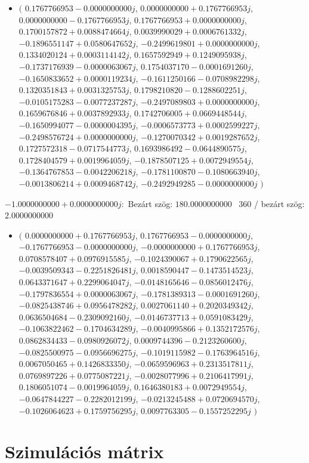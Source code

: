 \documentclass[14pt,a4paper]{article}
\begin{document}
\begin{itemize}
\item
$\big($
$0.1767766953-0.0000000000j$, $0.0000000000+0.1767766953j$, $0.0000000000-0.1767766953j$, $0.1767766953+0.0000000000j$, $0.1700157872+0.0088474664j$, $0.0039990029+0.0006761332j$, $-0.1896551147+0.0580647652j$, $-0.2499619801+0.0000000000j$, $0.1334020124+0.0003114142j$, $0.1657592949+0.1249095938j$, $-0.1737176939-0.0000063067j$, $0.1754037170-0.0001691260j$, $-0.1650833652+0.0000119234j$, $-0.1611250166-0.0708982298j$, $0.1320351843+0.0031325753j$, $0.1798210820-0.1288602251j$, $-0.0105175283-0.0077237287j$, $-0.2497089803+0.0000000000j$, $0.1659676846+0.0037892933j$, $0.1742706005+0.0669448544j$, $-0.1650994077-0.0000004395j$, $-0.0006573773+0.0002599227j$, $-0.2498576724+0.0000000000j$, $-0.1270070342+0.0019287652j$, $0.1727572318-0.0717544773j$, $0.1693986492-0.0644890575j$, $0.1728404579+0.0019964059j$, $-0.1878507125+0.0072949554j$, $-0.1364767853-0.0042206218j$, $-0.1781100870-0.1080663940j$, $-0.0013806214+0.0009468742j$, $-0.2492949285-0.0000000000j$
$\big)$
\end{itemize}
$-1.0000000000+0.0000000000j$:\
Bezárt szög: $180.0000000000$ \
360 / bezárt szög: $2.0000000000$\
\begin{itemize}
\item
$\big($
$0.0000000000+0.1767766953j$, $0.1767766953-0.0000000000j$, $-0.1767766953-0.0000000000j$, $-0.0000000000+0.1767766953j$, $0.0708578407+0.0976915585j$, $-0.1024390067+0.1790622565j$, $-0.0039509343-0.2251826481j$, $0.0018590447-0.1473514523j$, $0.0643371647+0.2299064047j$, $-0.0148165646-0.0856012476j$, $-0.1797836554+0.0000063067j$, $-0.1781389313-0.0001691260j$, $-0.0825438746+0.0956478282j$, $0.0027061140+0.2020349342j$, $0.0636504684-0.2309092160j$, $-0.0146737713+0.0591083429j$, $-0.1063822462-0.1704634289j$, $-0.0040995866+0.1352172576j$, $0.0862834433-0.0980926072j$, $0.0009744396-0.2123260600j$, $-0.0825500975-0.0956696275j$, $-0.1019115982-0.1763964516j$, $0.0067050465+0.1426833350j$, $-0.0659596963+0.2313517811j$, $0.0769897226+0.0775087221j$, $-0.0028077996+0.2106417991j$, $0.1806051074-0.0019964059j$, $0.1646380183+0.0072949554j$, $-0.0647844227-0.2282012199j$, $-0.0213245488+0.0720694570j$, $-0.1026064623+0.1759756295j$, $0.0097763305-0.1557252295j$
$\big)$
\end{itemize}
\section{Szimulációs mátrix}
\end{document}
